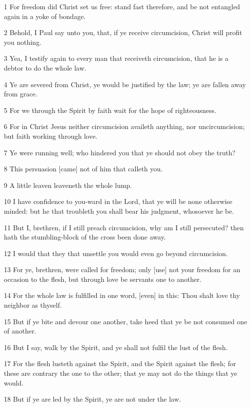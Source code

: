 \par 1 For freedom did Christ set us free: stand fast therefore, and be not entangled again in a yoke of bondage.
\par 2 Behold, I Paul say unto you, that, if ye receive circumcision, Christ will profit you nothing.
\par 3 Yea, I testify again to every man that receiveth circumcision, that he is a debtor to do the whole law.
\par 4 Ye are severed from Christ, ye would be justified by the law; ye are fallen away from grace.
\par 5 For we through the Spirit by faith wait for the hope of righteousness.
\par 6 For in Christ Jesus neither circumcision availeth anything, nor uncircumcision; but faith working through love.
\par 7 Ye were running well; who hindered you that ye should not obey the truth?
\par 8 This persuasion [came] not of him that calleth you.
\par 9 A little leaven leaveneth the whole lump.
\par 10 I have confidence to you-ward in the Lord, that ye will be none otherwise minded: but he that troubleth you shall bear his judgment, whosoever he be.
\par 11 But I, brethren, if I still preach circumcision, why am I still persecuted? then hath the stumbling-block of the cross been done away.
\par 12 I would that they that unsettle you would even go beyond circumcision.
\par 13 For ye, brethren, were called for freedom; only [use] not your freedom for an occasion to the flesh, but through love be servants one to another.
\par 14 For the whole law is fulfilled in one word, [even] in this: Thou shalt love thy neighbor as thyself.
\par 15 But if ye bite and devour one another, take heed that ye be not consumed one of another.
\par 16 But I say, walk by the Spirit, and ye shall not fulfil the lust of the flesh.
\par 17 For the flesh lusteth against the Spirit, and the Spirit against the flesh; for these are contrary the one to the other; that ye may not do the things that ye would.
\par 18 But if ye are led by the Spirit, ye are not under the law.
